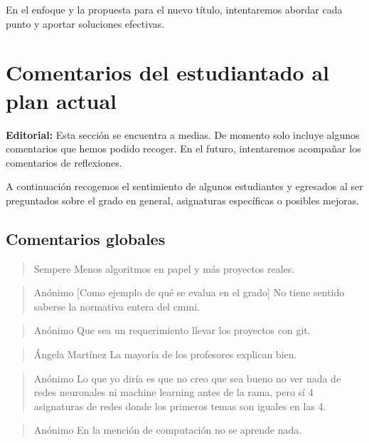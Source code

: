 En el enfoque y la propuesta para el nuevo título,
intentaremos abordar cada punto y aportar soluciones efectivas.

\section{Comentarios del estudiantado al plan actual}

\textbf{Editorial:} Esta sección se encuentra a medias.
De momento solo incluye algunos comentarios que hemos podido recoger.
En el futuro, intentaremos acompañar los comentarios de reflexiones.

A continuación recogemos el sentimiento de algunos estudiantes y egresados 
al ser preguntados sobre
el grado en general, asignaturas específicas o posibles mejoras.

\subsection{Comentarios globales}

\begin{quote}{Sempere}\label{qte:less-algorithms-in-paper}
    Menos algoritmos en papel y más proyectos reales.
\end{quote}

\begin{quote}{Anónimo}\label{qte:cmmi}
    [Como ejemplo de qué se evalua en el grado]
    No tiene sentido saberse la normativa entera del cmmi.
\end{quote}

\begin{quote}{Anónimo}
    Que sea un requerimiento llevar los proyectos con git.
\end{quote}

\begin{quote}{Ángela Martínez}
    La mayoría de los profesores explican bien.
\end{quote}

\begin{quote}{Anónimo}
    Lo que yo diría es que no creo que sea bueno
    no ver nada de redes neuronales ni machine learning antes de la rama,
    pero sí 4 asignaturas de redes donde los primeros temas
    son iguales en las 4.
\end{quote}

\begin{quote}{Anónimo}
    En la mención de computación no se aprende nada.
\end{quote}

